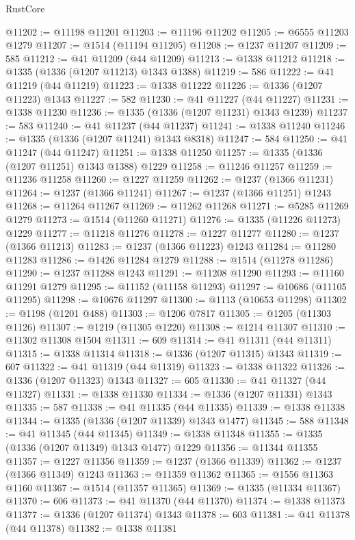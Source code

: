 \begin{lexlean}{RustCore}
\begin{coremodule}
@11202 := @11198 @11201
@11203 := @11196 @11202
@11205 := @6555 @11203 @1279
@11207 := @1514 (@11194 @11205)
@11208 := @1237 @11207
@11209 := 585
@11212 := @41 @11209 (@44 @11209)
@11213 := @1338 @11212
@11218 := @1335 (@1336 (@1207 @11213) @1343 @1388)
@11219 := 586
@11222 := @41 @11219 (@44 @11219)
@11223 := @1338 @11222
@11226 := @1336 (@1207 @11223) @1343
@11227 := 582
@11230 := @41 @11227 (@44 @11227)
@11231 := @1338 @11230
@11236 := @1335 (@1336 (@1207 @11231) @1343 @1239)
@11237 := 583
@11240 := @41 @11237 (@44 @11237)
@11241 := @1338 @11240
@11246 := @1335 (@1336 (@1207 @11241) @1343 @8318)
@11247 := 584
@11250 := @41 @11247 (@44 @11247)
@11251 := @1338 @11250
@11257 := @1335 (@1336 (@1207 @11251) @1343 @1388) @1229
@11258 := @11246 @11257
@11259 := @11236 @11258
@11260 := @1227 @11259
@11262 := @1237 (@1366 @11231)
@11264 := @1237 (@1366 @11241)
@11267 := @1237 (@1366 @11251) @1243
@11268 := @11264 @11267
@11269 := @11262 @11268
@11271 := @5285 @11269 @1279
@11273 := @1514 (@11260 @11271)
@11276 := @1335 (@11226 @11273) @1229
@11277 := @11218 @11276
@11278 := @1227 @11277
@11280 := @1237 (@1366 @11213)
@11283 := @1237 (@1366 @11223) @1243
@11284 := @11280 @11283
@11286 := @1426 @11284 @1279
@11288 := @1514 (@11278 @11286)
@11290 := @1237 @11288 @1243
@11291 := @11208 @11290
@11293 := @11160 @11291 @1279
@11295 := @11152 (@11158 @11293)
@11297 := @10686 (@11105 @11295)
@11298 := @10676 @11297
@11300 := @1113 (@10653 @11298)
@11302 := @1198 (@1201 @488)
@11303 := @1206 @7817
@11305 := @1205 (@11303 @1126)
@11307 := @1219 (@11305 @1220)
@11308 := @1214 @11307
@11310 := @11302 @11308 @1504
@11311 := 609
@11314 := @41 @11311 (@44 @11311)
@11315 := @1338 @11314
@11318 := @1336 (@1207 @11315) @1343
@11319 := 607
@11322 := @41 @11319 (@44 @11319)
@11323 := @1338 @11322
@11326 := @1336 (@1207 @11323) @1343
@11327 := 605
@11330 := @41 @11327 (@44 @11327)
@11331 := @1338 @11330
@11334 := @1336 (@1207 @11331) @1343
@11335 := 587
@11338 := @41 @11335 (@44 @11335)
@11339 := @1338 @11338
@11344 := @1335 (@1336 (@1207 @11339) @1343 @1477)
@11345 := 588
@11348 := @41 @11345 (@44 @11345)
@11349 := @1338 @11348
@11355 := @1335 (@1336 (@1207 @11349) @1343 @1477) @1229
@11356 := @11344 @11355
@11357 := @1227 @11356
@11359 := @1237 (@1366 @11339)
@11362 := @1237 (@1366 @11349) @1243
@11363 := @11359 @11362
@11365 := @1556 @11363 @1160
@11367 := @1514 (@11357 @11365)
@11369 := @1335 (@11334 @11367)
@11370 := 606
@11373 := @41 @11370 (@44 @11370)
@11374 := @1338 @11373
@11377 := @1336 (@1207 @11374) @1343
@11378 := 603
@11381 := @41 @11378 (@44 @11378)
@11382 := @1338 @11381

\end{coremodule}
\end{lexlean}
